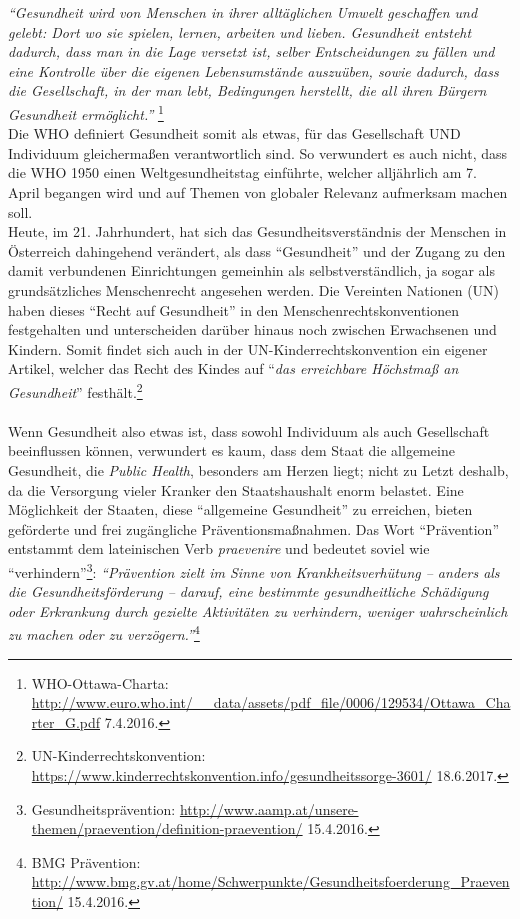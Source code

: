\documentclass[
    a4paper,
    12pt,
    hyphens,
    chapterprefix=true,
    headheight=33pt,
    footheight=29pt,
    headings=optiontohead,
]{scrartcl}
\begin{document}
\textit{"`Gesundheit wird von Menschen in ihrer alltäglichen Umwelt geschaffen und gelebt: Dort wo sie spielen, lernen, arbeiten und lieben. Gesundheit entsteht dadurch, dass man in die Lage versetzt ist, selber Entscheidungen zu fällen und eine Kontrolle über die eigenen Lebensumstände auszuüben, sowie dadurch, dass die Gesellschaft, in
der man lebt, Bedingungen herstellt, die all ihren Bürgern Gesundheit ermöglicht."'}
\footnote{WHO-Ottawa-Charta: \url{http://www.euro.who.int/__data/assets/pdf_file/0006/129534/Ottawa_Charter_G.pdf} 7.4.2016.}\\
Die WHO definiert Gesundheit somit als etwas, für das Gesellschaft UND Individuum gleichermaßen verantwortlich sind. So verwundert es auch nicht, dass die WHO 1950 einen Weltgesundheitstag einführte, welcher alljährlich am 7. April begangen wird und auf Themen von globaler Relevanz aufmerksam machen soll.\\
Heute, im 21. Jahrhundert, hat sich das Gesundheitsverständnis der Menschen in Österreich dahingehend verändert, als dass "`Gesundheit"' und der Zugang zu den damit verbundenen Einrichtungen gemeinhin als selbstverständlich, ja sogar als grundsätzliches Menschenrecht angesehen werden. Die Vereinten Nationen (UN) haben dieses "`Recht auf Gesundheit"' in den Menschenrechtskonventionen festgehalten und unterscheiden darüber hinaus noch zwischen Erwachsenen und Kindern. Somit findet sich auch in der UN-Kinderrechtskonvention ein eigener Artikel, welcher das Recht des Kindes auf "`\textit{das erreichbare Höchstmaß an Gesundheit}"' festhält.\footnote{UN-Kinderrechtskonvention: \url{https://www.kinderrechtskonvention.info/gesundheitssorge-3601/} 18.6.2017.}\\
\\
Wenn Gesundheit also etwas ist, dass sowohl Individuum als auch Gesellschaft beeinflussen können, verwundert es kaum, dass dem Staat die allgemeine Gesundheit, die \textit{Public Health}, besonders am Herzen liegt; nicht zu Letzt deshalb, da die Versorgung vieler Kranker den Staatshaushalt enorm belastet. Eine Möglichkeit der Staaten, diese "`allgemeine Gesundheit"' zu erreichen, bieten geförderte und frei zugängliche Präventionsmaßnahmen. Das Wort "`Prävention"' entstammt dem lateinischen Verb \textit{praevenire} und bedeutet soviel wie "`verhindern"'\footnote{Gesundheitsprävention: \url{http://www.aamp.at/unsere-themen/praevention/definition-praevention/} 15.4.2016.}: \textit{"`Prävention zielt im Sinne von Krankheitsverhütung
-- anders als die Gesundheitsförderung -- darauf, eine bestimmte gesundheitliche Schädigung oder Erkrankung durch gezielte Aktivitäten zu verhindern, weniger wahrscheinlich zu machen oder zu verzögern."'}\footnote{BMG Prävention: \url{http://www.bmg.gv.at/home/Schwerpunkte/Gesundheitsfoerderung\_Praevention/} 15.4.2016.}\\
\end{document}
